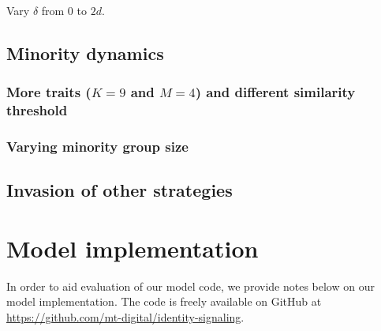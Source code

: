 \documentclass[11pt,letterpaper]{article}
\begin{document}
Vary $\delta$ from 0 to $2d$.

\subsection{Minority dynamics} 

\subsubsection{More traits ($K=9$ and $M=4$) and different similarity threshold}

\subsubsection{Varying minority group size}

\subsection{Invasion of other strategies}


\section{Model implementation}

In order to aid evaluation of our model code, we provide notes below on 
our model implementation. The code is freely available on GitHub at
\url{https://github.com/mt-digital/identity-signaling}.
\end{document}
